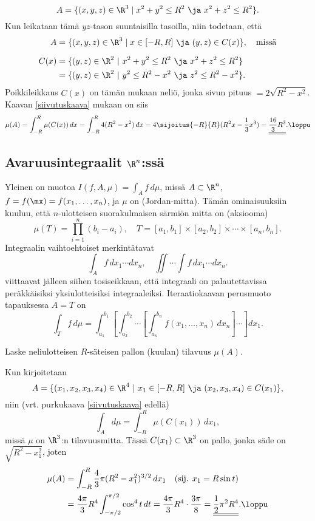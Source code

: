 \[
A=\{(x,y,z)\in\R^3 \mid x^2+y^2 \le R^2\ \ja\ x^2+z^2 \le R^2\}.
\]
Kun leikataan tämä $yz$-tason suuntaisilla tasoilla, niin todetaan, että
\begin{align*}
A    &= \{(x,y,z)\in\R^3 \mid x\in [-R,R]\ \ja\ (y,z)\in C(x)\}, \quad \text{missä} \\[2mm]
C(x) &= \{(y,z)\in\R^2 \ | \ x^2+y^2\leq R^2 \ \ja \ x^2+z^2\leq R^2\} \\
     &= \{(y,z)\in\R^2 \ | \ y^2\leq R^2-x^2 \ \ja \ z^2\leq R^2-x^2\}.
\end{align*}
Poikkileikkaus $C(x)$ on tämän mukaan neliö, jonka sivun pituus $=2\sqrt{R^2-x^2}$.
Kaavan \eqref{siivutuskaava} mukaan on siis
\[
\mu(A) = \int_{-R}^R \mu(C(x))\,dx
       = \int_{-R}^R 4(R^2-x^2)\,dx
       = 4\sijoitus{-R}{R}(R^2x-\frac{1}{3}x^3)
       = \underline{\underline{\frac{16}{3}R^3}}. \loppu
\]

\pagebreak
\subsection*{Avaruusintegraalit $\R^n$:ssä}

Yleinen  on muotoa $I(f,A,\mu)=\int_A f\,d\mu$,
 
%
missä $A\subset\R^n$, $f=f(\mx)=f(x_1,\ldots,x_n)$, ja $\mu$ on  (Jordan-mitta). Tämän ominaisuuksiin kuuluu, että $n$-ulotteisen suorakulmaisen
särmiön mitta on (aksiooma)
\[ 
\mu(T)=\prod_{i=1}^n (b_i-a_i), \quad 
                 T=[a_1,b_1] \times [a_2,b_2] \times \cdots \times [a_n,b_n]. 
\]
Integraalin vaihtoehtoiset merkintätavat
\[
\int_A f\,dx_1\cdots dx_n,\quad \iint\cdots\int f\,dx_1\cdots dx_n.
\]
viittaavat jälleen siihen tosiseikkaan, että integraali on palautettavissa peräkkäisiksi 
yksiulotteisiksi integraaleiksi. Iteraatiokaavan perusmuoto tapauksessa $A=T$ on
\[
\int_T f\,d\mu=\int_{a_1}^{b_1}\left[\int_{a_2}^{b_2} \cdots \left[\int_{a_n}^{b_n} 
                                             f(x_1,\ldots,x_n)\,dx_n\right]\cdots\right]dx_1.
\]
\begin{Exa}
Laske neliulotteisen $R$-säteisen pallon (kuulan) tilavuus $\mu(A)$.
\end{Exa}
\ratk Kun kirjoitetaan
\[
A=\{(x_1,x_2,x_3,x_4)\in\R^4 \ | \ x_1\in [-R,R] \ \ja \ (x_2,x_3,x_4)\in C(x_1)\},
\]
niin (vrt. purkukaava \eqref{siivutuskaava} edellä)
\[
\int_A d\mu=\int_{-R}^R \mu(C(x_1))\,dx_1,
\]
missä $\mu$ on $\R^3$:n tilavuusmitta. Tässä $C(x_1)\subset\R^3$ on pallo, jonka säde on 
$\sqrt{R^2-x_1^2}$, joten
\begin{align*}
\mu(A) &= \int_{-R}^R \frac{4}{3}\pi(R^2-x_1^2)^{3/2}\,dx_1\quad (\text{sij. } x_1=R\sin t) \\
       &= \frac{4\pi}{3}R^4\int_{-\pi/2}^{\pi/2} \cos^4 t\,dt
        = \frac{4\pi}{3}R^4\cdot\frac{3\pi}{8}        
        = \underline{\underline{\frac{1}{2}\pi^2 R^4}}. \loppu
\end{align*}

